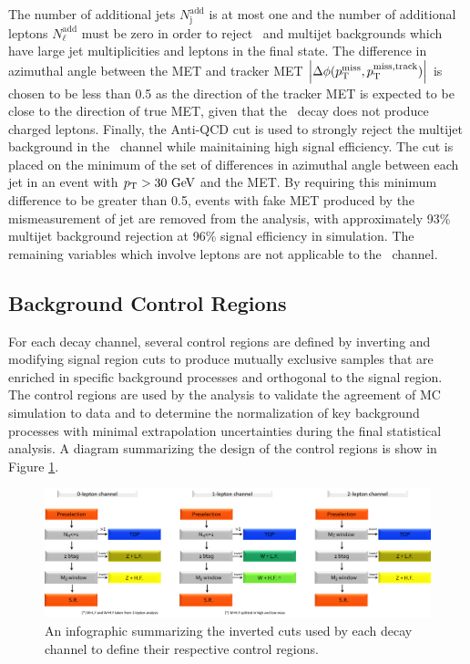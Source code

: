 The number of additional jets $N_{\mathrm{j}}^{\mathrm{add}}$ is at most one and the number of additional leptons $N_{\mathrm{\ell}}^{\mathrm{add}}$ must be zero in order to reject \qrkt\qrktbar\ and multijet backgrounds which have large jet multiplicities and leptons in the final state. The difference in azimuthal angle between the MET and tracker MET $\left| \Delta\phi(p_{\mathrm{T}}^{\mathrm{miss}}, p_{\mathrm{T}}^{\mathrm{miss, track}}) \right|$ is chosen to be less than 0.5 as the direction of the tracker MET is expected to be close to the direction of true MET, given that the \bosZ\ decay does not produce charged leptons. Finally, the Anti-QCD cut is used to strongly reject the multijet background in the \ZnnH\ channel while mainitaining high signal efficiency. The cut is placed on the minimum of the set of differences in azimuthal angle between each jet in an event with $p_{\mathrm{T}} > 30\ \mathrm{GeV}$ and the MET. By requiring this minimum difference to be greater than 0.5, events with fake MET produced by the mismeasurement of jet \pT are removed from the analysis, with approximately 93\% multijet background rejection at 96\% signal efficiency in simulation. The remaining variables which involve leptons are not applicable to the \ZnnH\ channel.

\subsection{Background Control Regions} \label{CRs}

For each decay channel, several control regions are defined by inverting and modifying signal region cuts to produce mutually exclusive samples that are enriched in specific background processes and orthogonal to the signal region. The control regions are used by the analysis to validate the agreement of MC simulation to data and to determine the normalization of key background processes with minimal extrapolation uncertainties during the final statistical analysis. A diagram summarizing the design of the control regions is show in Figure \ref{fig:controlregiondef}.

\begin{figure}[htbp]
  \centering
    \includegraphics[width=6in]{images/CR_VH}
    \caption[\VHbb\ Control Region Definitions]{An infographic summarizing the inverted cuts used by each decay channel to define their respective control regions.}
    \label{fig:controlregiondef}
\end{figure}

